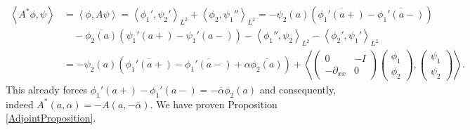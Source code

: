 \documentclass[11pt, a4paper,reqno]{amsart}
\theoremstyle{plain}
\theoremstyle{definition}
\theoremstyle{remark}
\newcommand{\inner}[2]{\left\langle{#1}, {#2}\right\rangle}
\newcommand{\1}{\mathds 1}
\begin{document}
\begin{align*}
    \inner{A^\ast\phi}{\psi} &= \inner{\phi}{A\psi} = \inner{\phi_1'}{\psi_2'}_{L^2} + \inner{\phi_2}{\psi_1''}_{L^2} = -\psi_2(a)\left(\overline{\phi_1'(a+)} - \overline{\phi_1'(a-)}\right) \\ &\quad- \overline{\phi_2(a)}\left(\psi_1'(a+) - \psi_1'(a-)\right) - \inner{\phi_1''}{\psi_2}_{L^2} - \inner{\phi_2'}{\psi_1'}_{L^2} \\
    &= -\psi_2(a)\left(\overline{\phi_1'(a+)} -\overline{\phi_1'(a-)} + \alpha\overline{\phi_2(a)}\right) + \inner{\begin{pmatrix}
        0 & -I \\ -\partial_{xx} & 0 
    \end{pmatrix}\begin{pmatrix}
        \phi_1 \\ \phi_2
    \end{pmatrix}}{\begin{pmatrix}
        \psi_1 \\ \psi_2
    \end{pmatrix}}.
\end{align*}
This already forces $\phi_1'(a+) - \phi_1'(a-) = - \overline{\alpha} \phi_2(a)$ and consequently, indeed $A^\ast(a, \alpha) = -A(a, -\overline{\alpha})$. We have proven Proposition \ref{AdjointProposition}.
\end{document}
